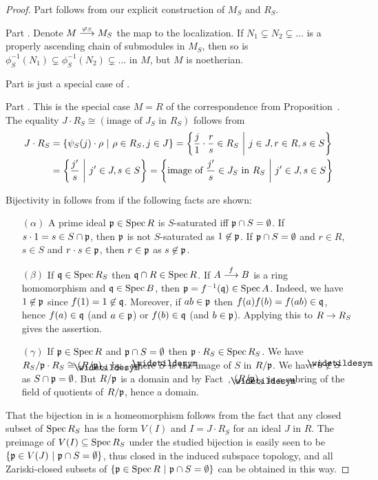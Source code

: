 \documentclass[a4paper,parskip=half,numbers=enddot, DIV=12]{scrreprt}
\begin{document}
	\begin{proof}
		Part  follows from our explicit construction of $M_S$ and $R_S$.
		
		Part . Denote $M\morphism[\phi_S]M_S$ the map to the localization. If $N_1\subsetneq N_2\subsetneq \ldots$ is a properly ascending chain of submodules in $M_S$, then so is $\phi_S^{-1}(N_1)\subsetneq \phi_S^{-1}(N_2)\subsetneq \ldots$ in $M$, but $M$ is noetherian.
		
		Part  is just a special case of .
		
		Part . This is the special case $M=R$ of the correspondence from Proposition~. The equality $J\cdot R_S \cong (\text{image of } J_S \text{ in } R_S)$ follows from 
			\begin{align*}
				J\cdot R_S &= \left\{\psi_S(j) \cdot\rho \ \middle|\  \rho \in R_S, j\in J\right\} = \left\{\frac{j}{1}\cdot\frac{r}{s}\in R_S\ \middle|\  j\in J, r\in R, s\in S\right\}\\
				&= \left\{\frac{j'}{s}\ \middle|\  j'\in J, s\in S\right\} = \left\{ \text{image of } \frac{j'}{s}\in J_S \text{ in } R_S\ \middle|\  j' \in J, s\in S\right\}
			\end{align*}
		
		Bijectivity in  follows from  if the following facts are shown:
			\begin{itemize}
			 \item [$(\alpha)$]
				A prime ideal $\mathfrak{p}\in \operatorname{Spec} R$ is $S$-saturated iff $\mathfrak{p}\cap S = \emptyset$. If $s\cdot 1 = s \in S\cap \mathfrak{p}$, then $\mathfrak{p}$ is not $S$-saturated as $1\not\in \mathfrak{p}$. If $\mathfrak{p}\cap S = \emptyset$ and $r\in R$, $s\in S$ and $r\cdot s\in \mathfrak{p}$, then $r\in \mathfrak{p}$ as $s\not \in\mathfrak{p}$.
			\item[$(\beta)$]
				If $\mathfrak{q}\in \operatorname{Spec} R_S$ then $\mathfrak{q}\cap R\in \operatorname{Spec} R$. If $A\morphism[f] B$ is a ring homomorphism and $\mathfrak{q}\in \operatorname{Spec} B$, then $\mathfrak{p}= f^{-1}(\mathfrak{q})\in \operatorname{Spec} A$. Indeed, we have $1\not\in \mathfrak{p}$ since $f(1) = 1\not \in\mathfrak{q}$. Moreover, if $ab\in\mathfrak{p}$ then $f(a)f(b)=f(ab)\in\mathfrak{q}$, hence $f(a)\in \mathfrak{q}$ (and $a\in \mathfrak{p}$) or $f(b)\in\mathfrak{q}$ (and $b\in\mathfrak{p}$). Applying this to $R\morphism R_S$ gives the assertion.
			\item[$(\gamma)$]
				If $\mathfrak{p}\in \operatorname{Spec} R$ and $\mathfrak{p}\cap S= \emptyset$ then $\mathfrak{p}\cdot R_S\in \operatorname{Spec} R_S$. We have $R_S/\pp\cdot R_S\cong (R/\pp)_{\snake S}$ by , where $\snake S$ is the image of $S$ in $R/\mathfrak{p}$. We have $0\not\in \snake S$ as $S\cap \mathfrak{p} = \emptyset$. But $R/\mathfrak{p}$ is a domain and by Fact~, $(R/\pp)_{\snake S}$ is a subring of the field of quotients of $R/\mathfrak{p}$, hence a domain.
			\end{itemize}
			That the bijection in  is a homeomorphism follows from the fact that any closed subset of $\operatorname{Spec} R_S$ has the form $V(I)$ and $I = J\cdot R_S$ for an ideal $J$ in $R$. The preimage of $V(I)\subseteq \operatorname{Spec} R_S$ under the studied bijection is easily seen to be $\left\{\mathfrak{p}\in V(J) \ \middle|\  \mathfrak{p}\cap S= \emptyset\right\}$, thus closed in the induced subspace topology, and all Zariski-closed subsets of $\left\{\mathfrak{p}\in\operatorname{Spec} R\ \middle|\  \mathfrak{p}\cap S=\emptyset\right\}$ can be obtained in this way.
		

\end{proof}
\end{document}

